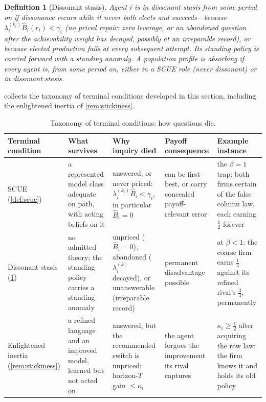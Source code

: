 \documentclass[11pt]{article}
\newtheorem{definition}[assumption]{Definition}
\theoremstyle{definition}
\begin{document}
\begin{definition}[Dissonant stasis]
\label{def:stasis}
Agent $i$ is in \emph{dissonant stasis} from some period on if dissonance recurs while it never both elects and succeeds---because $\lambda_i^{(k_i)}\widehat B_i(r_i)<\gamma_i$ (no priced repair: zero leverage, or an abandoned question after the achievability weight has decayed, possibly at an irreparable record), or because elected production fails at every subsequent attempt.
Its standing policy is carried forward with a standing anomaly.
A population profile is \emph{absorbing} if every agent is, from some period on, either in a SCUE role (never dissonant) or in dissonant stasis.
\end{definition}

 collects the taxonomy of terminal conditions developed in this section, including the enlightened inertia of \cref{rem:stickiness}.

\begin{table}[t]
\centering
\caption{Taxonomy of terminal conditions: how questions die.}
\label{tab:terminal}
\footnotesize
\begin{tabularx}{\textwidth}{@{}>{\raggedright\arraybackslash}p{2.5cm}>{\raggedright\arraybackslash}X>{\raggedright\arraybackslash}X>{\raggedright\arraybackslash}X>{\raggedright\arraybackslash}X@{}}
\toprule
Terminal condition & What survives & Why inquiry died & Payoff consequence & Example instance\\
\midrule
SCUE (\cref{def:scue}) & a represented model class adequate on path, with acting beliefs on it & answered, or never priced: $\lambda_i^{(k_i)}\widehat B_i<\gamma_i$, in particular $\widehat B_i=0$ & can be first-best, or carry concealed payoff-relevant error & the $\beta=1$ trap: both firms certain of the false column law, each earning $\tfrac12$ forever\\
\addlinespace
Dissonant stasis (\cref{def:stasis}) & no admitted theory; the standing policy carries a standing anomaly & unpriced ($\widehat B_i=0$), abandoned ($\lambda_i^{(k)}$ decayed), or unanswerable (irreparable record) & permanent disadvantage possible & at $\beta<1$: the coarse firm earns $\tfrac14$ against its refined rival's $\tfrac34$, permanently\\
\addlinespace
Enlightened inertia (\cref{rem:stickiness}) & a refined language and an improved model, learned but not acted on & answered, but the recommended switch is unpriced: horizon-$T$ gain $\le\kappa_i$ & the agent forgoes the improvement its rival captures & $\kappa_i\ge\tfrac12$ after acquiring the row law: the firm knows it and holds its old policy\\
\bottomrule
\end{tabularx}
\end{table}
\end{document}
